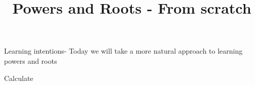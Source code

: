 \documentclass[12pt, a4paper, addpoints]{exam}
\title{Powers and Roots - From scratch}
\date{}
\newcommand{\ms}{\vspace{11 mm}}
\begin{document}

\maketitle
\vspace{-18mm}

\begin{questions}

\question Learning intentions- Today we will take a more natural approach to learning powers and roots


\Large


\question Calculate

\begin{multicols}{3}
\end{multicols}
\begin{multicols}{3}
\end{multicols}
\end{questions}
\end{document}
